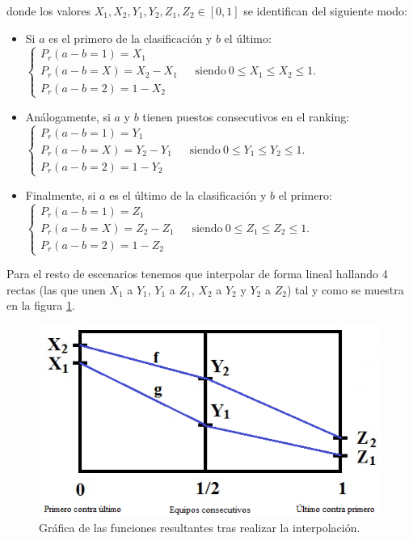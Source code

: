 donde los valores $X_{1},X_{2},Y_{1},Y_{2},Z_{1},Z_{2} \in [0,1]$ se identifican del siguiente modo:
\begin{itemize}
	\item Si $a$ es el primero de la clasificación y $b$ el último:\\
	 	 
	 $\begin{cases}
	 	P_{r}(a-b=1)=X_{1}\\
	 	P_{r}(a-b=X)=X_{2}-X_{1} \ \ \ \ \ \ \ \text{siendo} \ 0 \leq X_{1} \leq X_{2} \leq 1.\\
	 	P_{r}(a-b=2)=1-X_{2} 
	 \end{cases}$\\
	 
	\item Análogamente, si $a$ y $b$ tienen puestos consecutivos en el ranking:\\
	
	$\begin{cases}
	P_{r}(a-b=1)=Y_{1}\\
	P_{r}(a-b=X)=Y_{2}-Y_{1} \ \ \ \ \ \ \ \text{siendo} \ 0 \leq Y_{1} \leq Y_{2} \leq 1.\\
	P_{r}(a-b=2)=1-Y_{2} 
	\end{cases}$\\
	
	\item Finalmente, si $a$ es el último de la clasificación y $b$ el primero:\\
	
	$\begin{cases}
	P_{r}(a-b=1)=Z_{1}\\
	P_{r}(a-b=X)=Z_{2}-Z_{1} \ \ \ \ \ \ \ \text{siendo} \ 0 \leq Z_{1} \leq Z_{2} \leq 1.\\
	P_{r}(a-b=2)=1-Z_{2} 
	\end{cases}$
\end{itemize}

Para el resto de escenarios tenemos que interpolar de forma lineal hallando 4 rectas (las que unen $X_{1}$ a $Y_{1}$, $Y_{1}$ a $Z_{1}$, $X_{2}$ a $Y_{2}$ y $Y_{2}$ a $Z_{2}$) tal y como se muestra en la figura \ref{fig:interpolar}.

\begin{figure}[htb]
	\centering
	\includegraphics[scale=0.7]{images/interpolar.png}
	\caption{Gráfica de las funciones resultantes tras realizar la interpolación.} \label{fig:interpolar}
\end{figure}

